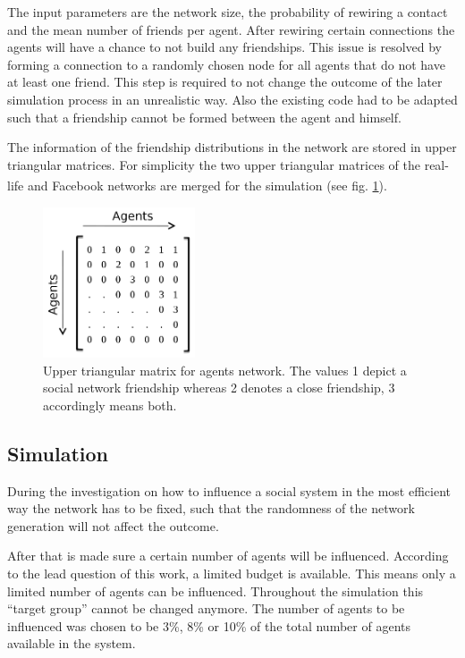 \documentclass[11pt]{article}
\begin{document}
The input parameters are the network size, the probability of rewiring a contact and the mean number of friends per agent. After rewiring certain connections the agents will have a chance to not build any friendships. This issue is resolved by forming a connection to a randomly chosen node for all agents that do not have at least one friend. This step is required to not change the outcome of the later simulation process in an unrealistic way. Also the existing code had to be adapted such that a friendship cannot be formed between the agent and himself.

The information of the friendship distributions in the network are stored in upper triangular matrices. For simplicity the two upper triangular matrices of the real-life and Facebook\textsuperscript{\textregistered} networks are merged for the simulation (see fig. \ref{fig:Matrix}).
\begin{figure}
	\centering
	\includegraphics[width=0.4\textwidth]{Graphs/Matrix2.png}
	\caption{Upper triangular matrix for agents network. The values 1 depict a social network friendship whereas 2 denotes a close friendship, 3 accordingly means both.}
	\label{fig:Matrix}
\end{figure}

\subsection{Simulation}
During the investigation on how to influence a social system in the most efficient way the network has to be fixed, such that the randomness of the network generation will not affect the outcome.

After that is made sure a certain number of agents will be influenced. According to the lead question of this work, a limited budget is available. This means only a limited number of agents can be influenced. Throughout the simulation this “target group” cannot be changed anymore. The number of agents to be influenced was chosen to be 3\%, 8\% or 10\% of the total number of agents available in the system. 
\end{document}
